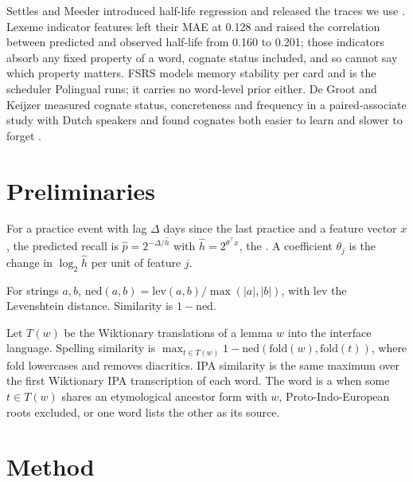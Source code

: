\documentclass[11pt]{article}
\begin{document}
Settles and Meeder introduced half-life regression and released the
traces we use \autocite{settles2016hlr,settles2016data}. Lexeme indicator features left their MAE at 0.128 and raised the
correlation between predicted and observed half-life from 0.160 to
0.201; those indicators absorb any fixed property of a word, cognate
status included, and so cannot say which property matters. FSRS \autocite{ye2022fsrs} models memory
stability per card and is the scheduler Polingual runs; it carries no
word-level prior either. De Groot and Keijzer measured cognate status,
concreteness and frequency in a paired-associate study with Dutch
speakers and found cognates both easier to learn and slower to forget
\autocite{degroot2000hard}.

\section{Preliminaries}
\label{sec:prelim}

\begin{definition}
\label{def:hlr}
For a practice event with lag $\Delta$ days since the last practice and a
feature vector $x$, the predicted recall is $\hat p = 2^{-\Delta/\hat h}$
with $\hat h = 2^{\theta^\top x}$, the . A
coefficient $\theta_j$ is the change in $\log_2 \hat h$ per unit of
feature $j$.
\end{definition}

\begin{definition}
\label{def:ned}
For strings $a, b$, $\mathrm{ned}(a,b) = \mathrm{lev}(a,b)/\max(|a|,|b|)$,
with $\mathrm{lev}$ the Levenshtein distance. Similarity is
$1-\mathrm{ned}$.
\end{definition}

\begin{definition}
\label{def:cognate}
Let $T(w)$ be the Wiktionary translations of a lemma $w$ into the
interface language. Spelling similarity is
$\max_{t\in T(w)} 1-\mathrm{ned}(\mathrm{fold}(w),\mathrm{fold}(t))$, where
$\mathrm{fold}$ lowercases and removes diacritics. IPA similarity is the
same maximum over the first Wiktionary IPA transcription of each word.
The word is a  when some $t \in T(w)$ shares an
etymological ancestor form with $w$, Proto-Indo-European roots excluded,
or one word lists the other as its source.
\end{definition}

\section{Method}
\label{sec:method}
\end{document}
